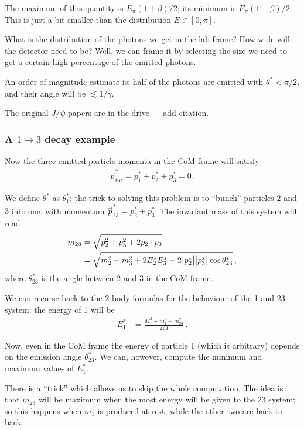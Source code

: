 \documentclass[main.tex]{subfiles}
\begin{document}
The maximum of this quantity is \(E_\pi (1 + \beta ) /2\); its minimum is \(E_\pi (1 - \beta ) / 2\). 
This is just a bit smaller than the distribution \(E \in [0, \pi ]\). 

What is the distribution of the photons we get in the lab frame? How wide will the detector need to be? 
Well, we can frame it by selecting the size we need to get a certain high percentage of the emitted photons. 

An order-of-magnitude estimate is: half of the photons are emitted with \(\theta^{*} < \pi /2\), and their angle will be \(\lesssim 1 / \gamma \).

The original \(J/\psi \) papers are in the drive --- add citation.

\subsubsection{A \(1 \to 3\) decay example}

Now the three emitted particle momenta in the CoM frame will satisfy 
%
\begin{align}
\vec{p}^{*} _{\text{tot}} = 
p^{*}_{1} + 
p^{*}_{2} + 
p^{*}_{3} = 0
\,.
\end{align}

We define \(\theta^{*}\) as \(\theta^{*}_1\); the trick to solving this problem is to ``bunch'' particles \(2\) and \(3\) into one, with momentum \(\vec{p}^{*}_{23} = p^{*}_{2} + p^{*}_{3}\). 
The invariant mass of this system will read 
%
\begin{align}
m_{\text{23}} &= \sqrt{p_2^2 + p_3^2 + 2 p_2 \cdot p_3}  \\
&= \sqrt{m_2^2 + m_3^2 + 2 E_2^{*} E_3^{*} - 2 \abs{p_2^{*}} \abs{p_3^{*}} \cos \theta^{*}_{23}}
\,,
\end{align}
%
where \(\theta^{*}_{23}\) is the angle between 2 and 3 in the CoM frame. 

We can recurse back to the 2 body formulas for the behaviour of the 1 and 23 system: the energy of 1 will be 
%
\begin{align}
E_1^{*} &= \frac{M^2 + m_1^2 - m_{23}^2}{2M}
\,.
\end{align}

Now, even in the CoM frame the energy of particle 1 (which is arbitrary) depends on the emission angle \(\theta^{*}_{23}\). 
We can, however, compute the minimum and maximum values of \(E_1^{*}\).

There is a ``trick'' which allows us to skip the whole computation. 
The idea is that \(m_{23} \) will be maximum when the most energy will be given to the 23 system; so this happens when \(m_1 \) is produced at rest, while the other two are back-to-back. 
\end{document}
